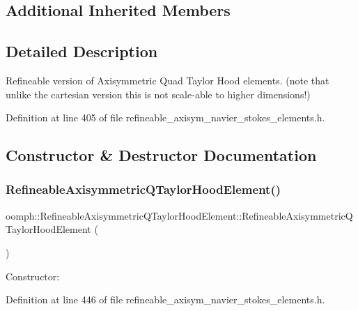 \subsection*{Additional Inherited Members}


\subsection{Detailed Description}
Refineable version of Axisymmetric Quad Taylor Hood elements. (note that unlike the cartesian version this is not scale-\/able to higher dimensions!) 

Definition at line 405 of file refineable\+\_\+axisym\+\_\+navier\+\_\+stokes\+\_\+elements.\+h.



\subsection{Constructor \& Destructor Documentation}
\mbox{\label{classoomph_1_1RefineableAxisymmetricQTaylorHoodElement_a569f6f6fffca13180c20a66090ba0ddd}} 
\subsubsection{\texorpdfstring{Refineable\+Axisymmetric\+Q\+Taylor\+Hood\+Element()}{RefineableAxisymmetricQTaylorHoodElement()}}
{\footnotesize\ttfamily oomph\+::\+Refineable\+Axisymmetric\+Q\+Taylor\+Hood\+Element\+::\+Refineable\+Axisymmetric\+Q\+Taylor\+Hood\+Element (\begin{DoxyParamCaption}{ }\end{DoxyParamCaption})\hspace{0.3cm}{\ttfamily [inline]}}



Constructor\+: 



Definition at line 446 of file refineable\+\_\+axisym\+\_\+navier\+\_\+stokes\+\_\+elements.\+h.



